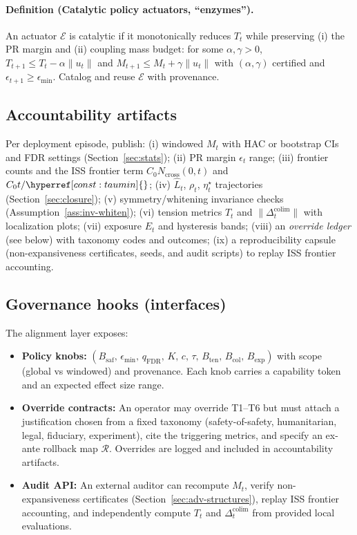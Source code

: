 \documentclass[10pt]{article}
\newcommand{\constref}[1]{%
  \hyperref[const:#1]{\ensuremath{\csname constsym#1\endcsname}}%
}
\begin{document}
\paragraph{Definition (Catalytic policy actuators, ``enzymes'').} An actuator $\mathcal E$ is catalytic if it monotonically reduces $T_t$ while preserving (i) the PR margin and (ii) coupling mass budget: for some $\alpha,\gamma>0$, $T_{t+1}\le T_t-\alpha\|u_t\|$ and $M_{t+1}\le M_t+\gamma\|u_t\|$ with $(\alpha,\gamma)$ certified and $\epsilon_{t+1}\ge\epsilon_{\min}$. Catalog and reuse $\mathcal E$ with provenance.

\subsection*{Accountability artifacts}
Per deployment episode, publish: (i) windowed $M_t$ with HAC or bootstrap CIs and FDR settings (Section~\ref{sec:stats}); (ii) PR margin $\epsilon_t$ range; (iii) frontier counts and the ISS frontier term $C_0 N_{\mathrm{cross}}(0,t)$ and $C_0 t/\constref{taumin}$; (iv) $\widehat L_t$, $\rho_t$, $\eta^\star_t$ trajectories (Section~\ref{sec:closure}); (v) symmetry/whitening invariance checks (Assumption~\ref{ass:inv-whiten}); (vi) tension metrics $T_t$ and $\|\Delta^{\mathrm{colim}}_t\|$ with localization plots; (vii) exposure $E_t$ and hysteresis bands; (viii) an \emph{override ledger} (see below) with taxonomy codes and outcomes; (ix) a reproducibility capsule (non-expansiveness certificates, seeds, and audit scripts) to replay ISS frontier accounting.

\subsection*{Governance hooks (interfaces)}
The alignment layer exposes:
\begin{itemize}[leftmargin=*]
  \item \textbf{Policy knobs:} $(B_{\mathrm{saf}},\,\epsilon_{\min},\,q_{\mathrm{FDR}},\,K,\,c,\,\tau,\,B_{\mathrm{ten}},\,B_{\mathrm{col}},\,B_{\mathrm{exp}})$ with scope (global vs windowed) and provenance. Each knob carries a capability token and an expected effect size range.
  \item \textbf{Override contracts:} An operator may override T1--T6 but must attach a justification chosen from a fixed taxonomy (safety-of-safety, humanitarian, legal, fiduciary, experiment), cite the triggering metrics, and specify an ex-ante rollback map $\mathcal R$. Overrides are logged and included in accountability artifacts.
  \item \textbf{Audit API:} An external auditor can recompute $M_t$, verify non-expansiveness certificates (Section~\ref{sec:adv-structures}), replay ISS frontier accounting, and independently compute $T_t$ and $\Delta^{\mathrm{colim}}_t$ from provided local evaluations.
\end{itemize}
\end{document}
